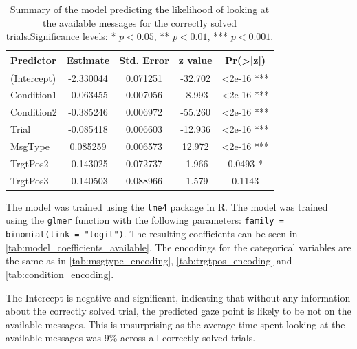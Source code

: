 \begin{table}[h!]
\centering
\begin{tabular}{lcccc}
\hline
\textbf{Predictor} & \textbf{Estimate} & \textbf{Std. Error} & \textbf{z value} & \textbf{Pr(>|z|)} \\
\hline
(Intercept)          & -2.330044         & 0.071251            & -32.702          & <2e-16 ***        \\
Condition1           & -0.063455         & 0.007056            & -8.993           & <2e-16 ***        \\
Condition2           & -0.385246         & 0.006972            & -55.260          & <2e-16 ***        \\
Trial                & -0.085418         & 0.006603            & -12.936          & <2e-16 ***        \\
MsgType             & 0.085259          & 0.006573            & 12.972           & <2e-16 ***        \\
TrgtPos2             & -0.143025         & 0.072737            & -1.966           & 0.0493 *          \\
TrgtPos3             & -0.140503         & 0.088966            & -1.579           & 0.1143            \\
\hline
\end{tabular}
\caption{Summary of the model predicting the likelihood of looking at the available messages for the correctly solved trials.Significance levels: * $p < 0.05$, ** $p < 0.01$, *** $p < 0.001$.}
\label{tab:model_coefficients_available}
\end{table}

The model was trained using the \texttt{lme4} package in R. The model was trained using the \texttt{glmer} function with the following parameters: \texttt{family = binomial(link = "logit")}. The resulting coefficients can be seen in \autoref{tab:model_coefficients_available}. The encodings for the categorical variables are the same as in \autoref{tab:msgtype_encoding}, \autoref{tab:trgtpos_encoding} and \autoref{tab:condition_encoding}.

The Intercept is negative and significant, indicating that without any information about the correctly solved trial, the predicted gaze point is likely to be not on the available messages. This is unsurprising as the average time spent looking at the available messages was 9\% across all correctly solved trials. 

